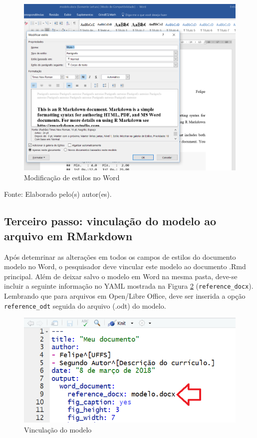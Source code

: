 \documentclass[12pt,brazil,oneside]{book}
\begin{document}
\begin{figure}[H]

{\centering \includegraphics[width=0.8\linewidth]{rmarkestilos1} 

}

\caption{Modificação de estilos no Word}\label{fig:rmarkestilos1}
\end{figure}

Fonte: Elaborado pelo(s) autor(es).

\hypertarget{terceiro-passo-vinculacao-do-modelo-ao-arquivo-em-rmarkdown}{%
\subsection{Terceiro passo: vinculação do modelo ao arquivo em
RMarkdown}\label{terceiro-passo-vinculacao-do-modelo-ao-arquivo-em-rmarkdown}}

Após detemrinar as alterações em todos os campos de estilos do documento
modelo no Word, o pesquisador deve vincular este modelo ao documento
.Rmd principal. Além de deixar salvo o modelo em Word na mesma pasta,
deve-se incluir a seguinte informação no YAML mostrada na Figura
\ref{fig:rmarkestilos2} (\texttt{reference\_docx}). Lembrando que para
arquivos em Open/Libre Office, deve ser inserida a opção
\texttt{reference\_odt} seguida do arquivo (.odt) do modelo.

\begin{figure}[H]

{\centering \includegraphics[width=0.8\linewidth]{rmarkestilos2} 

}

\caption{Vinculação do modelo}\label{fig:rmarkestilos2}
\end{figure}
\end{document}
